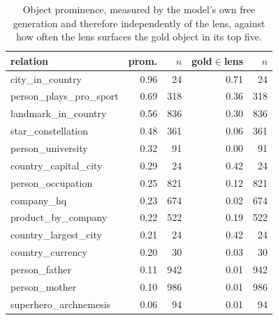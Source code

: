 \begin{table}[t]
\centering
\caption{Object prominence, measured by the model's own free generation and therefore independently of the lens, against how often the lens surfaces the gold object in its top five.}
\label{tab:prominence}
\begin{tabular}{@{}lrrrr@{}}
\toprule
relation & prom. & $n$ & gold$\in$lens & $n$ \\
\midrule
city\_in\_country & 0.96 & 24 & 0.71 & 24 \\
person\_plays\_pro\_sport & 0.69 & 318 & 0.36 & 318 \\
landmark\_in\_country & 0.56 & 836 & 0.30 & 836 \\
star\_constellation & 0.48 & 361 & 0.06 & 361 \\
person\_university & 0.32 & 91 & 0.00 & 91 \\
country\_capital\_city & 0.29 & 24 & 0.42 & 24 \\
person\_occupation & 0.25 & 821 & 0.12 & 821 \\
company\_hq & 0.23 & 674 & 0.02 & 674 \\
product\_by\_company & 0.22 & 522 & 0.19 & 522 \\
country\_largest\_city & 0.21 & 24 & 0.42 & 24 \\
country\_currency & 0.20 & 30 & 0.03 & 30 \\
person\_father & 0.11 & 942 & 0.01 & 942 \\
person\_mother & 0.10 & 986 & 0.01 & 986 \\
superhero\_archnemesis & 0.06 & 94 & 0.01 & 94 \\
\bottomrule
\end{tabular}
\end{table}
